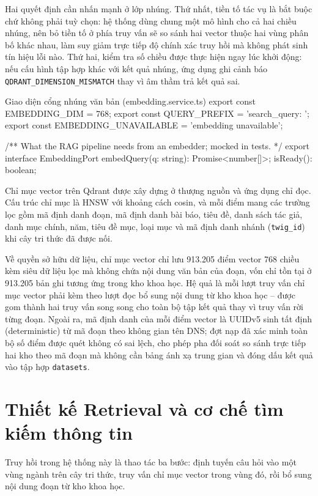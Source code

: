 Hai quyết định cần nhấn mạnh ở lớp nhúng. Thứ nhất, tiền tố tác vụ là bắt buộc chứ không phải tuỳ chọn: hệ thống dùng chung một mô hình cho cả hai chiều nhúng, nên bỏ tiền tố ở phía truy vấn sẽ so sánh hai vector thuộc hai vùng phân bố khác nhau, làm suy giảm trực tiếp độ chính xác truy hồi mà không phát sinh tín hiệu lỗi nào. Thứ hai, kiểm tra số chiều được thực hiện ngay lúc khởi động: nếu cấu hình tập hợp khác với kết quả nhúng, ứng dụng ghi cảnh báo \texttt{QDRANT\_DIMENSION\_MISMATCH} thay vì âm thầm trả kết quả sai.

\begin{tsbox}{Giao diện cổng nhúng văn bản (embedding.service.ts)}
export const EMBEDDING_DIM = 768;
export const QUERY_PREFIX = 'search_query: ';
export const EMBEDDING_UNAVAILABLE = 'embedding unavailable';

/** What the RAG pipeline needs from an embedder; mocked in tests. */
export interface EmbeddingPort {
  embedQuery(q: string): Promise<number[]>;
  isReady(): boolean;
}
\end{tsbox}

Chỉ mục vector trên Qdrant được xây dựng ở thượng nguồn và ứng dụng chỉ đọc. Cấu trúc chỉ mục là HNSW với khoảng cách cosin, và mỗi điểm mang các trường lọc gồm mã định danh đoạn, mã định danh bài báo, tiêu đề, danh sách tác giả, danh mục chính, năm, tiêu đề mục, loại mục và mã định danh nhánh (\texttt{twig\_id}) khi cây tri thức đã được nối.

Về quyền sở hữu dữ liệu, chỉ mục vector chỉ lưu 913.205 điểm vector 768 chiều kèm siêu dữ liệu lọc mà không chứa nội dung văn bản của đoạn, vốn chỉ tồn tại ở 913.205 bản ghi tương ứng trong kho khoa học. Hệ quả là mỗi lượt truy vấn chỉ mục vector phải kèm theo lượt đọc bổ sung nội dung từ kho khoa học -- được gom thành hai truy vấn song song cho toàn bộ tập kết quả thay vì truy vấn rời từng đoạn. Ngoài ra, mã định danh của mỗi điểm vector là UUIDv5 sinh tất định (deterministic) từ mã đoạn theo không gian tên DNS; đợt nạp đã xác minh toàn bộ số điểm được quét không có sai lệch, cho phép pha đối soát so sánh trực tiếp hai kho theo mã đoạn mà không cần bảng ánh xạ trung gian và đóng dấu kết quả vào tập hợp \texttt{datasets}.

\section{Thiết kế Retrieval và cơ chế tìm kiếm thông tin}
\label{sec:thiet-ke-retrieval}

Truy hồi trong hệ thống này là thao tác ba bước: định tuyến câu hỏi vào một vùng ngành trên cây tri thức, truy vấn chỉ mục vector trong vùng đó, rồi bổ sung nội dung đoạn từ kho khoa học.

